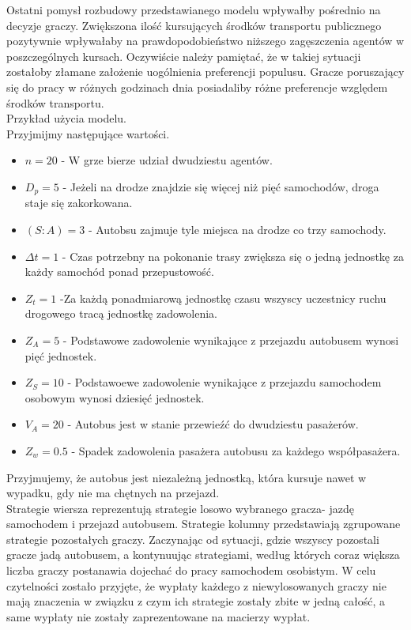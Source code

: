\documentclass[12pt,a4paper]{article}
\begin{document}
Ostatni pomysł rozbudowy przedstawianego modelu wpływałby pośrednio na decyzje graczy. Zwiększona ilość kursujących środków transportu publicznego pozytywnie wpływałaby na prawdopodobieństwo niższego zagęszczenia agentów w poszczególnych kursach. Oczywiście należy pamiętać, że w takiej sytuacji zostałoby złamane założenie uogólnienia preferencji populusu. Gracze poruszający się do pracy w różnych godzinach dnia posiadaliby różne preferencje względem środków transportu.\\

Przykład użycia modelu.\\
Przyjmijmy następujące wartości.
\begin{itemize}
	\item
	$n = 20$ - W grze bierze udział dwudziestu agentów.
	\item
	$D_p = 5$ - Jeżeli na drodze znajdzie się więcej niż pięć samochodów, droga staje się zakorkowana.
	\item
	$(S:A) = 3$ - Autobsu zajmuje tyle miejsca na drodze co trzy samochody.
	\item
	$\Delta{t} = 1$ - Czas potrzebny na pokonanie trasy zwiększa się o jedną jednostkę za każdy samochód ponad przepustowość.
	\item
	$Z_t = 1$ -Za każdą ponadmiarową jednostkę czasu wszyscy uczestnicy ruchu drogowego tracą jednostkę zadowolenia.
	\item
	$Z_A = 5$ - Podstawowe zadowolenie wynikające z przejazdu autobusem wynosi pięć jednostek.
	\item
	$Z_S = 10$ - Podstawoewe zadowolenie wynikające z przejazdu samochodem osobowym wynosi dziesięć jednostek.
	\item
	$V_A = 20$ - Autobus jest w stanie przewieźć do dwudziestu pasażerów.
	\item
	$Z_w = 0.5$ - Spadek zadowolenia pasażera autobusu za każdego współpasażera.
\end{itemize}

Przyjmujemy, że autobus jest niezależną jednostką, która kursuje nawet w wypadku, gdy nie ma chętnych na przejazd.\\
Strategie wiersza reprezentują strategie losowo wybranego gracza- jazdę samochodem i przejazd autobusem. Strategie kolumny przedstawiają zgrupowane strategie pozostałych graczy. Zaczynając od sytuacji, gdzie wszyscy pozostali gracze jadą autobusem, a kontynuując strategiami, według których coraz większa liczba graczy postanawia dojechać do pracy samochodem osobistym. W celu czytelności zostało przyjęte, że wypłaty każdego z niewylosowanych graczy nie mają znaczenia w związku z czym ich strategie zostały zbite w jedną całość, a same wypłaty nie zostały zaprezentowane na macierzy wypłat.\\
\end{document}
